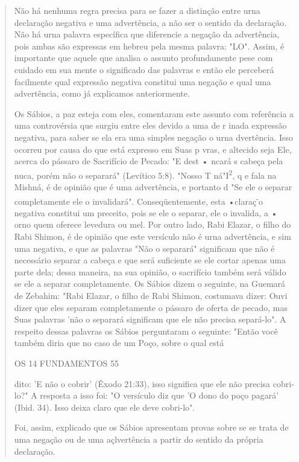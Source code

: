 \begin{quote}
Não há nenhuma regra precisa para se fazer a distinção entre urna
declaração negativa e uma advertência, a não ser o sentido da
declaração. Não há urna palavra específica que diferencie a negação da
advertência, pois ambas são expressas em hebreu pela mesma palavra:
"LO". Assim, é importante que aquele que analisa o assunto profundamente
pese com cuidado em sua mente o significado das palavras e então ele
perceberá facilmente qual expressão ne­gativa constitui uma negação e
qual uma advertência, como já explicamos anteriormente.

Os Sábios, a paz esteja com eles, comentaram este assunto com
refe­rência a uma controvérsia que surgiu entre eles devido a uma de r
inada ex­pressão negativa, para saber se ela era uma simples negação o
urna dvertên­cia. Isso ocorreu por causa do que está expresso em Suas p
vras, e altecido seja Ele, acerca do pássaro de Sacrifício de Pecado: "E
dest • ncará s cabeça pela nuca, porém não o separará" (Levítico 5:8).
"Nosso T ná"I\textsuperscript{2}, q e fala na Mishná, é de opinião que é
uma advertência, e portanto d "Se ele o separar completamente ele o
invalidará". Conseqüentemente, esta •claraç\textsuperscript{-}o negativa
constitui um preceito, pois se ele o separar, ele o invalida, a • orno
quem oferece levedura ou mel. Por outro lado, Rabi Elazar, o filho do
Rabi Shimon, é de opinião que este versículo não é urna advertência, e
sim uma negativa, e que as palavras "Não o separará" significam que não
é necessário separar a ca­beça e que será suficiente se ele cortar
apenas uma parte dela; dessa maneira, na sua opinião, o sacrifício
também será válido se ele a separar completamente. Os Sábios dizem o
seguinte, na Guemará de Zebahim: "Rabi Elazar, o filho de Rabi Shimon,
costumava dizer: Ouvi dizer que eles separam completamente o pássaro de
oferta de pecado, mas Suas palavras 'não o separará significam que ele
não precisa separá-lo". A respeito dessas palavras os Sábios perguntaram
o seguinte: "Então você também diria que no caso de um Poço, sobre o
qual está

OS 14 FUNDAMENTOS 55

dito: 'E não o cobrir' (Êxodo 21:33), isso significa que ele não precisa
cobri-lo?" A resposta a isso foi: "O versículo diz que 'O dono do poço
pagará' (Ibid. 34). Isso deixa claro que ele deve cobri-lo".

Foi, assim, explicado que os Sábios apresentam provas sobre se se trata
de uma negação ou de uma açlvertência a partir do sentido da própria
declaração.


\end{quote}
